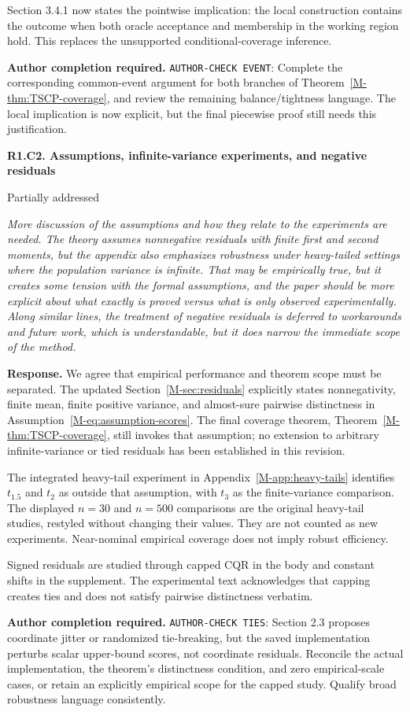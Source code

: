 \documentclass[11pt]{article}
\newcommand{\mssec}[1]{Section~\ref*{M-#1}}
\newcommand{\msapp}[1]{Appendix~\ref*{M-#1}}
\newcommand{\action}[1]{\par{\small\color{ActionRed}\textbf{Author completion required.} #1\par}}
\newcommand{\point}[3]{\par\Needspace{7\baselineskip}\medskip
\noindent\parbox[t]{0.77\linewidth}{\textbf{#1}}\hfill
\parbox[t]{0.21\linewidth}{\raggedleft\small\sffamily #2}\par\nopagebreak
{\color{ReviewerBlue}\small\itshape #3\par}\textbf{Response.} }
\begin{document}
Section 3.4.1 now states the pointwise implication: the local construction contains the outcome when both oracle acceptance and membership in the working region hold. This replaces the unsupported conditional-coverage inference.

\action{\texttt{AUTHOR-CHECK EVENT}: Complete the corresponding common-event argument for both branches of Theorem~\ref*{M-thm:TSCP-coverage}, and review the remaining balance/tightness language. The local implication is now explicit, but the final piecewise proof still needs this justification.}

\point{R1.C2. Assumptions, infinite-variance experiments, and negative residuals}{Partially addressed}{More discussion of the assumptions and how they relate to the experiments
are needed. The theory assumes nonnegative residuals with finite first
and second moments, but the appendix also emphasizes robustness under
heavy-tailed settings where the population variance is infinite. That
may be empirically true, but it creates some tension with the formal
assumptions, and the paper should be more explicit about what exactly is
proved versus what is only observed experimentally. Along similar
lines, the treatment of negative residuals is deferred to workarounds
and future work, which is understandable, but it does narrow the
immediate scope of the method.}
\label{response:R1.C2}
We agree that empirical performance and theorem scope must be separated. The updated \mssec{sec:residuals} explicitly states nonnegativity, finite mean, finite positive variance, and almost-sure pairwise distinctness in Assumption~\ref*{M-eq:assumption-scores}. The final coverage theorem, Theorem~\ref*{M-thm:TSCP-coverage}, still invokes that assumption; no extension to arbitrary infinite-variance or tied residuals has been established in this revision.

The integrated heavy-tail experiment in \msapp{app:heavy-tails} identifies $t_{1.5}$ and $t_2$ as outside that assumption, with $t_3$ as the finite-variance comparison. The displayed $n=30$ and $n=500$ comparisons are the original heavy-tail studies, restyled without changing their values. They are not counted as new experiments. Near-nominal empirical coverage does not imply robust efficiency.

Signed residuals are studied through capped CQR in the body and constant shifts in the supplement. The experimental text acknowledges that capping creates ties and does not satisfy pairwise distinctness verbatim.

\action{\texttt{AUTHOR-CHECK TIES}: Section 2.3 proposes coordinate jitter or randomized tie-breaking, but the saved implementation perturbs scalar upper-bound scores, not coordinate residuals. Reconcile the actual implementation, the theorem's distinctness condition, and zero empirical-scale cases, or retain an explicitly empirical scope for the capped study. Qualify broad robustness language consistently.}
\end{document}
